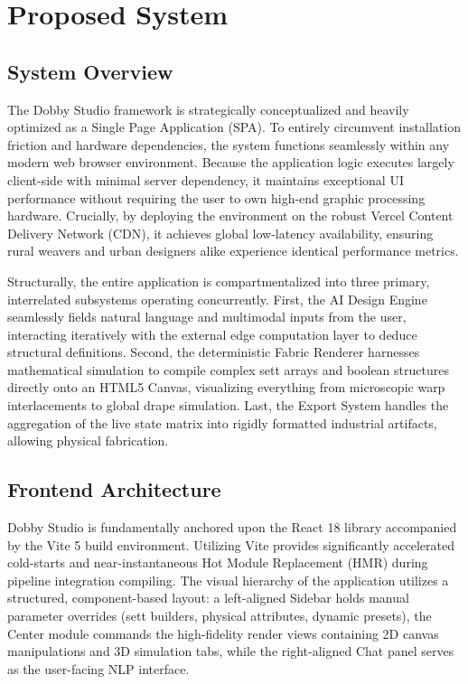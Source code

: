 \chapter{Proposed System}

\section{System Overview}
The Dobby Studio framework is strategically conceptualized and heavily optimized as a Single Page Application (SPA). To entirely circumvent installation friction and hardware dependencies, the system functions seamlessly within any modern web browser environment. Because the application logic executes largely client-side with minimal server dependency, it maintains exceptional UI performance without requiring the user to own high-end graphic processing hardware. Crucially, by deploying the environment on the robust Vercel Content Delivery Network (CDN), it achieves global low-latency availability, ensuring rural weavers and urban designers alike experience identical performance metrics.

Structurally, the entire application is compartmentalized into three primary, interrelated subsystems operating concurrently. First, the AI Design Engine seamlessly fields natural language and multimodal inputs from the user, interacting iteratively with the external edge computation layer to deduce structural definitions. Second, the deterministic Fabric Renderer harnesses mathematical simulation to compile complex sett arrays and boolean structures directly onto an HTML5 Canvas, visualizing everything from microscopic warp interlacements to global drape simulation. Last, the Export System handles the aggregation of the live state matrix into rigidly formatted industrial artifacts, allowing physical fabrication.

\section{Frontend Architecture}
Dobby Studio is fundamentally anchored upon the React 18 library accompanied by the Vite 5 build environment. Utilizing Vite provides significantly accelerated cold-starts and near-instantaneous Hot Module Replacement (HMR) during pipeline integration compiling. The visual hierarchy of the application utilizes a structured, component-based layout: a left-aligned Sidebar holds manual parameter overrides (sett builders, physical attributes, dynamic presets), the Center module commands the high-fidelity render views containing 2D canvas manipulations and 3D simulation tabs, while the right-aligned Chat panel serves as the user-facing NLP interface.

